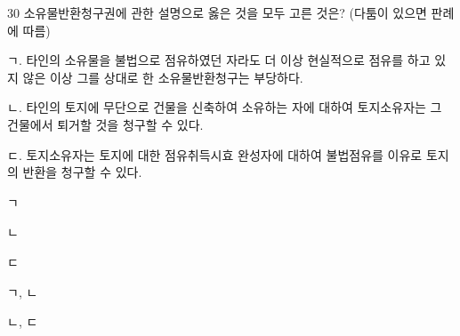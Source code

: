 \begin{question}{30}
소유물반환청구권에 관한 설명으로 옳은 것을 모두 고른 것은? (다툼이 있으면 판례에 따름)
\begin{framedtext}
ㄱ. 타인의 소유물을 불법으로 점유하였던 자라도 더 이상 현실적으로 점유를 하고 있지 않은 이상 그를 상대로 한 소유물반환청구는 부당하다. \par
ㄴ. 타인의 토지에 무단으로 건물을 신축하여 소유하는 자에 대하여 토지소유자는 그 건물에서 퇴거할 것을 청구할 수 있다. \par
ㄷ. 토지소유자는 토지에 대한 점유취득시효 완성자에 대하여 불법점유를 이유로 토지의 반환을 청구할 수 있다.
\end{framedtext}
\begin{choices}
  \item ㄱ
  \item ㄴ
  \item ㄷ
  \item ㄱ, ㄴ
  \item ㄴ, ㄷ
\end{choices}
\end{question}
